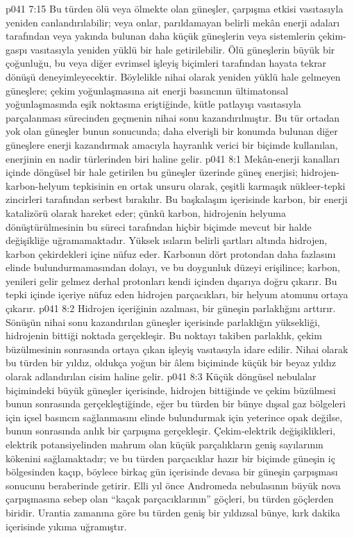 \vs p041 7:15 Bu türden ölü veya ölmekte olan güneşler, çarpışma etkisi vasıtasıyla yeniden canlandırılabilir; veya onlar, parıldamayan belirli mekân enerji adaları tarafından veya yakında bulunan daha küçük güneşlerin veya sistemlerin çekim\hyp{}gaspı vasıtasıyla yeniden yüklü bir hale getirilebilir. Ölü güneşlerin büyük bir çoğunluğu, bu veya diğer evrimsel işleyiş biçimleri tarafından hayata tekrar dönüşü deneyimleyecektir. Böylelikle nihai olarak yeniden yüklü hale gelmeyen güneşlere; çekim yoğunlaşmasına ait enerji basıncının ültimatonsal yoğunlaşmasında eşik noktasına eriştiğinde, kütle patlayışı vasıtasıyla parçalanması sürecinden geçmenin nihai sonu kazandırılmıştır. Bu tür ortadan yok olan güneşler bunun sonucunda; daha elverişli bir konumda bulunan diğer güneşlere enerji kazandırmak amacıyla hayranlık verici bir biçimde kullanılan, enerjinin en nadir türlerinden biri haline gelir.
\vs p041 8:1 Mekân\hyp{}enerji kanalları içinde döngüsel bir hale getirilen bu güneşler üzerinde güneş enerjisi; hidrojen\hyp{}karbon\hyp{}helyum tepkisinin en ortak unsuru olarak, çeşitli karmaşık nükleer\hyp{}tepki zincirleri tarafından serbest bırakılır. Bu başkalaşım içerisinde karbon, bir enerji katalizörü olarak hareket eder; çünkü karbon, hidrojenin helyuma dönüştürülmesinin bu süreci tarafından hiçbir biçimde mevcut bir halde değişikliğe uğramamaktadır. Yüksek ısıların belirli şartları altında hidrojen, karbon çekirdekleri içine nüfuz eder. Karbonun dört protondan daha fazlasını elinde bulundurmamasından dolayı, ve bu doygunluk düzeyi erişilince; karbon, yenileri gelir gelmez derhal protonları kendi içinden dışarıya doğru çıkarır. Bu tepki içinde içeriye nüfuz eden hidrojen parçacıkları, bir helyum atomunu ortaya çıkarır.
\vs p041 8:2 Hidrojen içeriğinin azalması, bir güneşin parlaklığını arttırır. Sönüşün nihai sonu kazandırılan güneşler içerisinde parlaklığın yüksekliği, hidrojenin bittiği noktada gerçekleşir. Bu noktayı takiben parlaklık, çekim büzülmesinin sonrasında ortaya çıkan işleyiş vasıtasıyla idare edilir. Nihai olarak bu türden bir yıldız, oldukça yoğun bir âlem biçiminde küçük bir beyaz yıldız olarak adlandırılan cisim haline gelir.
\vs p041 8:3 Küçük döngüsel nebulalar biçimindeki büyük güneşler içerisinde, hidrojen bittiğinde ve çekim büzülmesi bunun sonrasında gerçekleştiğinde, eğer bu türden bir bünye dışsal gaz bölgeleri için içsel basıncın sağlanmasını elinde bulundurmak için yeterince opak değilse, bunun sonrasında anlık bir çarpışma gerçekleşir. Çekim\hyp{}elektrik değişiklikleri, elektrik potansiyelinden mahrum olan küçük parçalıkların geniş sayılarının kökenini sağlamaktadır; ve bu türden parçacıklar hazır bir biçimde güneşin iç bölgesinden kaçıp, böylece birkaç gün içerisinde devasa bir güneşin çarpışması sonucunu beraberinde getirir. Elli yıl önce Andromeda nebulasının büyük nova çarpışmasına sebep olan “kaçak parçacıklarının” göçleri, bu türden göçlerden biridir. Urantia zamanına göre bu türden geniş bir yıldızsal bünye, kırk dakika içerisinde yıkıma uğramıştır.

